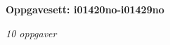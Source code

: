 \centerline{\bf Oppgavesett: i01420no-i01429no}
\vskip 10pt
\centerline{\it 10 oppgaver}\vskip 10pt
\vskip 10pt
